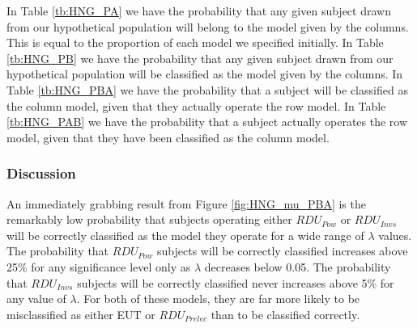 \documentclass[../main.tex]{subfiles}
\begin{document}
\begin{table}[ht!]
	\centering
	\captionsetup{justification=centering}
	\caption{$P(A | B)$}
	\label{tb:HNG_PAB}
	\begin{adjustbox}{}
	\end{adjustbox}
\end{table}

In Table \ref{tb:HNG_PA} we have the probability that any given subject drawn from our hypothetical population will belong to the model given by the columns.
This is equal to the proportion of each model we specified initially.
In Table \ref{tb:HNG_PB} we have the probability that any given subject drawn from our hypothetical population will be classified as the model given by the columns. 
In Table \ref{tb:HNG_PBA} we have the probability that a subject will be classified as the column model, given that they actually operate the row model.
In Table \ref{tb:HNG_PAB} we have the probability that a subject actually operates the row model, given that they have been classified as the column model.

\subsubsection{Discussion}

An immediately grabbing result from Figure \ref{fig:HNG_mu_PBA} is the remarkably low probability that subjects operating either $\mathit{RDU_{Pow}}$ or $\mathit{RDU_{Invs}}$ will be correctly classified as the model they operate for a wide range of $\lambda$ values.
The probability that $\mathit{RDU_{Pow}}$ subjects will be correctly classified increases above 25\% for any significance level only as $\lambda$ decreases below 0.05.
The probability that $\mathit{RDU_{Invs}}$ subjects will be correctly classified never increases above 5\% for any value of $\lambda$.
For both of these models, they are far more likely to be misclassified as either EUT or $\mathit{RDU_{Prelec}}$ than to be classified correctly.
\end{document}
